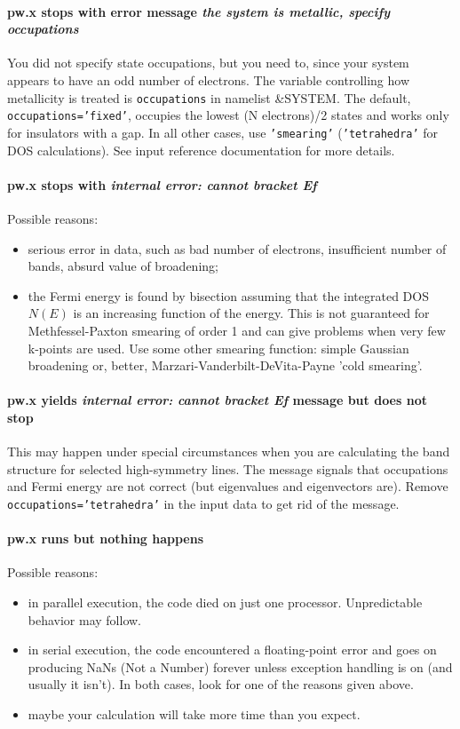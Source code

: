 \documentclass[12pt,a4paper]{article}
\begin{document}
\paragraph{pw.x stops with error message {\em the system is metallic,
 specify occupations}} 
You did not specify state occupations, but you need to, since your
system appears to have an odd number of electrons. The variable
controlling how metallicity is treated is \texttt{occupations} in namelist
\&SYSTEM. The default, \texttt{occupations='fixed'}, occupies the lowest
(N electrons)/2 states and works only for insulators with a gap. In all other
cases, use \texttt{'smearing'} (\texttt{'tetrahedra'} for DOS calculations). 
See input reference documentation for more details.

\paragraph{pw.x stops with {\em internal error: cannot bracket Ef}}
Possible reasons:
\begin{itemize}
\item serious error in data, such as bad number of electrons,
  insufficient number of bands, absurd value of broadening; 
\item the Fermi energy is found by bisection assuming that the
  integrated DOS $N(E)$ is an increasing function of the energy. This
  is not guaranteed for Methfessel-Paxton smearing of order 1 and can
  give problems when very few k-points are used. Use some other
  smearing function: simple Gaussian broadening or, better,
  Marzari-Vanderbilt-DeVita-Payne 'cold smearing'. 
\end{itemize}

\paragraph{pw.x yields {\em internal error: cannot bracket Ef} message 
but does not stop} 
This may happen under special circumstances when you are calculating
the band structure for selected high-symmetry lines. The message
signals that occupations and Fermi energy are not correct (but
eigenvalues and eigenvectors are). Remove \texttt{occupations='tetrahedra'}
in the input data to get rid of the message. 

\paragraph{pw.x runs but nothing happens}
Possible reasons:
\begin{itemize}
\item in parallel execution, the code died on just one
  processor. Unpredictable behavior may follow. 
\item in serial execution, the code encountered a floating-point error
  and goes on producing NaNs (Not a Number) forever unless exception
  handling is on (and usually it isn't). In both cases, look for one
  of the reasons given above. 
\item maybe your calculation will take more time than you expect.
\end{itemize}
\end{document}
